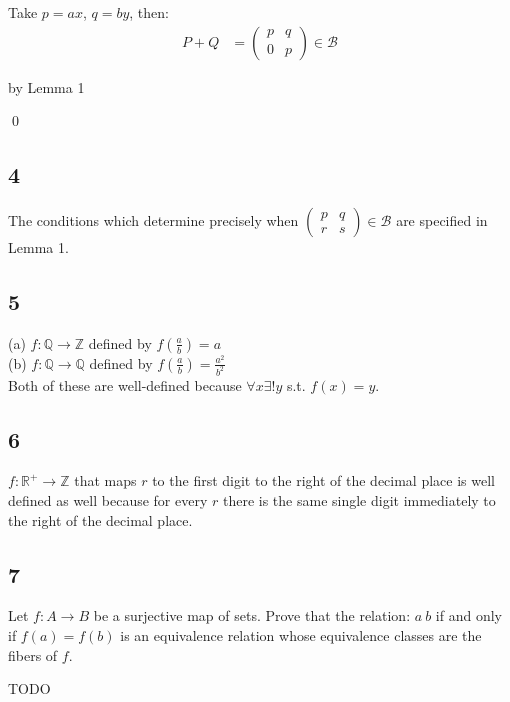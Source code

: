 \documentclass[12pt]{article}
\begin{document}
Take $p = a x$, $q = b y$, then: \\

\begin{align*}
P + Q &= \begin{pmatrix}
p & q \\
0 & p
\end{pmatrix} \in \mathcal{B}
\end{align*}

by Lemma 1

\qed{}

\subsection*{4}

The conditions which determine precisely when $\begin{pmatrix}
p & q \\
r & s
\end{pmatrix} \in \mathcal{B}$ are specified in Lemma 1.

\subsection*{5}

(a) $f : \mathbb{Q} \rightarrow \mathbb{Z}$ defined by $f(\frac{a}{b}) = a$ \\
(b) $f : \mathbb{Q} \rightarrow \mathbb{Q}$ defined by $f(\frac{a}{b}) = \frac{a^2}{b^2}$ \\

Both of these are well-defined because $\forall x \exists! y$ s.t. $f(x) = y$.

\subsection*{6}

$f : \mathbb{R}^{+} \rightarrow \mathbb{Z}$ that maps $r$ to the first digit to the right of the decimal place is well defined as well because for every $r$ there is the same single digit immediately to the right of the decimal place.

\subsection*{7}

Let $f : A \rightarrow B$ be a surjective map of sets. Prove that the relation: $a~b$ if and only if $f(a) = f(b)$ is an equivalence relation whose equivalence classes are the fibers of $f$.

TODO
\end{document}
